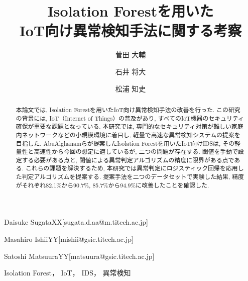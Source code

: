 \documentclass{css}
\begin{document}

\title{Isolation Forestを用いた\\IoT向け異常検知手法に関する考察}



\author{菅田 大輔}{Daisuke Sugata}{XX}[sugata.d.aa@m.titech.ac.jp]
\author{石井 将大}{Masahiro Ishii}{YY}[mishii@gsic.titech.ac.jp]
\author{松浦 知史}{Satoshi Matsuura}{YY}[matsuura@gsic.titech.ac.jp]



\begin{abstract}
    本論文では, Isolation Forestを用いたIoT向け異常検知手法の改善を行った. この研究の背景には, IoT（Internet of Things）の普及があり, すべてのIoT機器のセキュリティ確保が重要な課題となっている. 本研究では, 専門的なセキュリティ対策が難しい家庭内ネットワークなどの小規模環境に着目し, 軽量で高速な異常検知システムの提案を目指した. AbuAlghanamらが提案したIsolation Forestを用いたIoT向けIDSは, その軽量性と高速性から今回の想定に適しているが, 二つの問題が存在する. 閾値を手動で設定する必要がある点と, 閾値による異常判定アルゴリズムの精度に限界がある点である. これらの課題を解決するため, 本研究では異常判定にロジスティック回帰を応用した判定アルゴリズムを提案する. 提案手法を二つのデータセットで実験した結果, 精度がそれぞれ82.1\%から90.7\%, 85.7\%から94.9\%に改善したことを確認した. 
\end{abstract}


\begin{jkeyword}
Isolation Forest， IoT， IDS， 異常検知
\end{jkeyword}
\end{document}
